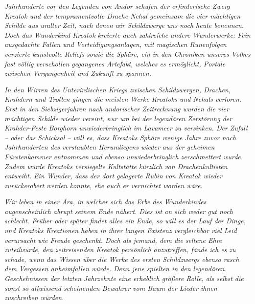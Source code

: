 \thispagestyle{plain}
\nurvollversion{\vspace*{\fill}}

\textit{Jahrhunderte vor den Legenden von Andor schufen der erfinderische Zwerg Kreatok und der tempramentvolle Drache Nehal gemeinsam die vier mächtigen Schilde aus uralter Zeit, nach denen wir Schildzwerge uns noch heute benennen. Doch das Wunderkind Kreatok kreierte auch zahlreiche andere Wunderwerke: Fein ausgedachte Fallen und Verteidigungsanlagen, mit magischen Runenfolgen verzierte kunstvolle Reliefs sowie die Sphäre, ein in den Chroniken unseres Volkes fast völlig verschollen gegangenes Artefakt, welches es ermöglicht, Portale zwischen Vergangenheit und Zukunft zu spannen.}
\bigskip

\textit{In den Wirren des Unterirdischen Kriegs zwischen Schildzwergen, Drachen, Krahdern und Trollen gingen die meisten Werke Kreatoks und Nehals verloren. Erst in den Siebzigerjahren nach andorischer Zeitrechnung wurden die vier mächtigen Schilde wieder vereint, nur um bei der legendären Zerstörung der Krahder-Feste Borghorn unwiederbringlich im Lavameer zu versinken. Der Zufall – oder das Schicksal – will es, dass Kreatoks Sphäre wenige Jahre zuvor nach Jahrhunderten des verstaubten Herumliegens wieder aus der geheimen Fürstenkammer entnommen und ebenso unwiederbringlich zerschmettert wurde. Zudem wurde Kreatoks versiegelte Kultstätte kürzlich von Drachenkultisten entweiht. Ein Wunder, dass der dort gelagerte Rubin von Kreatok wieder zurückerobert werden konnte, ehe auch er vernichtet worden wäre.}
\bigskip

\textit{Wir leben in einer Ära, in welcher sich das Erbe des Wunderkindes augenscheinlich abrupt seinem Ende nähert. Dies ist an sich weder gut noch schlecht. Früher oder später findet alles ein Ende, so will es der Lauf der Dinge, und Kreatoks Kreationen haben in ihrer langen Existenz vergleichbar viel Leid verursacht wie Freude geschenkt. Doch als jemand, dem die seltene Ehre zuteilwurde, den zeitreisenden Kreatok persönlich anzutreffen, fände ich es zu schade, wenn das Wissen über die Werke des ersten Schildzwergs ebenso rasch dem Vergessen anheimfallen würde. Denn jene spielten in den legendären Geschehnissen der letzten Jahrzehnte eine erheblich größere Rolle, als selbst die sonst so allwissend scheinenden Bewahrer vom Baum der Lieder ihnen zuschreiben würden.}
\bigskip

